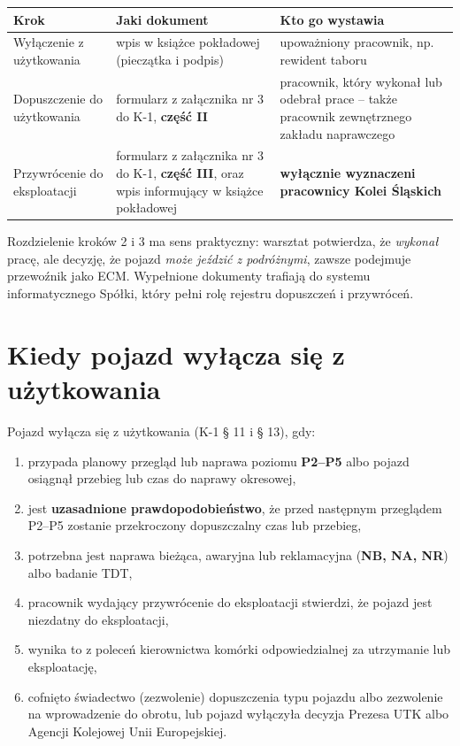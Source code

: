 \begin{center}
\begin{tabularx}{\linewidth}{@{}l>{\raggedright\arraybackslash}X>{\raggedright\arraybackslash}X@{}}
	\toprule
	\textbf{Krok} & \textbf{Jaki dokument} & \textbf{Kto go wystawia} \\
	\midrule
	Wyłączenie z użytkowania & wpis w książce pokładowej (pieczątka i podpis) & upoważniony pracownik, np. rewident taboru \\
	Dopuszczenie do użytkowania & formularz z załącznika nr 3 do K-1, \textbf{część II} & pracownik, który wykonał lub odebrał prace – także pracownik zewnętrznego zakładu naprawczego \\
	Przywrócenie do eksploatacji & formularz z załącznika nr 3 do K-1, \textbf{część III}, oraz wpis informujący w książce pokładowej & \textbf{wyłącznie wyznaczeni pracownicy Kolei Śląskich} \\
	\bottomrule
\end{tabularx}
\end{center}

Rozdzielenie kroków 2 i 3 ma sens praktyczny: warsztat potwierdza, że \textit{wykonał} pracę, ale decyzję, że pojazd \textit{może jeździć z podróżnymi}, zawsze podejmuje przewoźnik jako ECM. Wypełnione dokumenty trafiają do systemu informatycznego Spółki, który pełni rolę rejestru dopuszczeń i przywróceń.

\section{Kiedy pojazd wyłącza się z użytkowania}

Pojazd wyłącza się z użytkowania (K-1 § 11 i § 13), gdy:
\begin{enumerate}
	\item przypada planowy przegląd lub naprawa poziomu \textbf{P2–P5} albo pojazd osiągnął przebieg lub czas do naprawy okresowej,
	\item jest \textbf{uzasadnione prawdopodobieństwo}, że przed następnym przeglądem P2–P5 zostanie przekroczony dopuszczalny czas lub przebieg,
	\item potrzebna jest naprawa bieżąca, awaryjna lub reklamacyjna (\textbf{NB, NA, NR}) albo badanie TDT,
	\item pracownik wydający przywrócenie do eksploatacji stwierdzi, że pojazd jest niezdatny do eksploatacji,
	\item wynika to z poleceń kierownictwa komórki odpowiedzialnej za utrzymanie lub eksploatację,
	\item cofnięto świadectwo (zezwolenie) dopuszczenia typu pojazdu albo zezwolenie na wprowadzenie do obrotu, lub pojazd wyłączyła decyzja Prezesa UTK albo Agencji Kolejowej Unii Europejskiej.
\end{enumerate}

